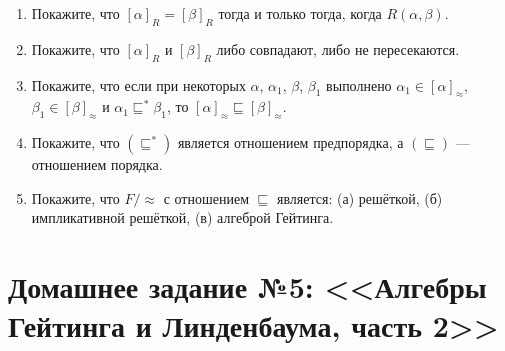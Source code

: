 \documentclass[10pt,a4paper,oneside]{article}
\begin{document}
\begin{enumerate}
\item Покажите, что $[\alpha]_R=[\beta]_R$ тогда и только тогда, когда $R(\alpha,\beta)$.
\item Покажите, что $[\alpha]_R$ и $[\beta]_R$ либо совпадают, либо не пересекаются.
\item Покажите, что если при некоторых $\alpha$, $\alpha_1$, $\beta$, $\beta_1$ 
выполнено $\alpha_1\in[\alpha]_\approx$, $\beta_1\in[\beta]_\approx$ и 
$\alpha_1\sqsubseteq^*\beta_1$, то $[\alpha]_\approx\sqsubseteq[\beta]_\approx$. 
\item Покажите, что $(\sqsubseteq^*)$ является отношением предпорядка, а $(\sqsubseteq)$ --- отношением
порядка.
\item Покажите, что $F/\!\!\approx$ с отношением $\sqsubseteq$ является: (а) решёткой, (б) импликативной
решёткой, (в) алгеброй Гейтинга.
\end{enumerate}

\section*{Домашнее задание №5: <<Алгебры Гейтинга и Линденбаума, часть 2>>}
\end{document}
